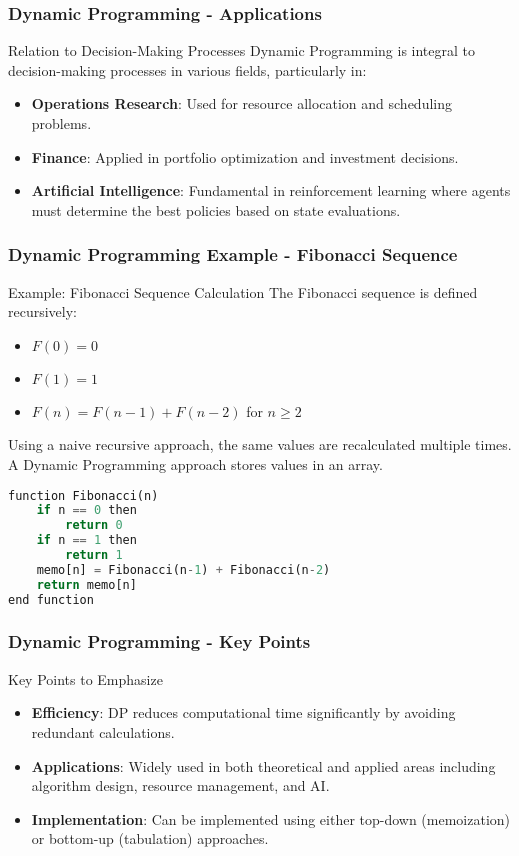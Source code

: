 \documentclass[aspectratio=169]{beamer}
\begin{document}
\begin{frame}[fragile]
    \frametitle{Dynamic Programming - Applications}
    \begin{block}{Relation to Decision-Making Processes}
        Dynamic Programming is integral to decision-making processes in various fields, particularly in:
        \begin{itemize}
            \item \textbf{Operations Research}: Used for resource allocation and scheduling problems.
            \item \textbf{Finance}: Applied in portfolio optimization and investment decisions.
            \item \textbf{Artificial Intelligence}: Fundamental in reinforcement learning where agents must determine the best policies based on state evaluations.
        \end{itemize}
    \end{block}
\end{frame}

\begin{frame}[fragile]
    \frametitle{Dynamic Programming Example - Fibonacci Sequence}
    \begin{block}{Example: Fibonacci Sequence Calculation}
        The Fibonacci sequence is defined recursively:
        \begin{itemize}
            \item \( F(0) = 0 \)
            \item \( F(1) = 1 \)
            \item \( F(n) = F(n-1) + F(n-2) \) for \( n \geq 2 \)
        \end{itemize}
        Using a naive recursive approach, the same values are recalculated multiple times. A Dynamic Programming approach stores values in an array.
    \end{block}

    \begin{lstlisting}[language=Python]
function Fibonacci(n)
    if n == 0 then
        return 0
    if n == 1 then
        return 1
    memo[n] = Fibonacci(n-1) + Fibonacci(n-2)
    return memo[n]
end function
    \end{lstlisting}
\end{frame}

\begin{frame}[fragile]
    \frametitle{Dynamic Programming - Key Points}
    \begin{block}{Key Points to Emphasize}
        \begin{itemize}
            \item \textbf{Efficiency}: DP reduces computational time significantly by avoiding redundant calculations.
            \item \textbf{Applications}: Widely used in both theoretical and applied areas including algorithm design, resource management, and AI.
            \item \textbf{Implementation}: Can be implemented using either top-down (memoization) or bottom-up (tabulation) approaches.
        \end{itemize}
    \end{block}
\end{frame}
\end{document}
